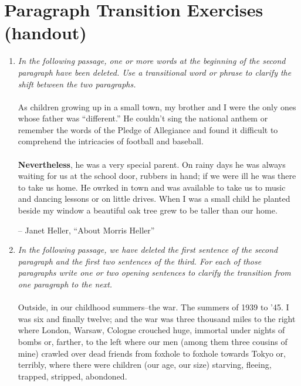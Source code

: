 \documentclass{article}
\begin{document}
\section{Paragraph Transition Exercises (handout)}

\begin{enumerate}
  
\item \textit{In the following passage, one or more words at the beginning of the
second paragraph have been deleted. Use a transitional word or phrase
to clarify the shift between the two paragraphs.}

\paragraph{} As children growing up in a small town, my brother and I were the only
ones whose father was ``different.'' He couldn't sing the national
anthem or remember the words of the Pledge of Allegiance and found it
difficult to comprehend the intricacies of football and baseball.
\paragraph{} \textbf{Nevertheless}, he was a very special parent. On rainy days he
was always waiting for us at the school door, rubbers in hand; if we
were ill he was there to take us home. He owrked in town and was
available to take us to music and dancing lessons or on little
drives. When I was a small child he planted beside my window a
beautiful oak tree grew to be taller than our home.

\hfill -- Janet Heller, ``About Morris Heller''

\item \textit{In the following passage, we have deleted the first sentence of
  the second paragraph and the first two sentences of the third. For
  each of those paragraphs write one or two opening sentences to
  clarify the transition from one paragraph to the next.}

  \paragraph{} Outside, in our childhood summers--the war. The summers of 1939 to
  '45. I was six and finally twelve; and the war was three thousand
  miles to the right where London, Warsaw, Cologne crouched huge,
  immortal under nights of bombs or, farther, to the left where our
  men (among them three cousins of mine) crawled over dead friends
  from foxhole to foxhole towards Tokyo or, terribly, where there were
  children (our age, our size) starving, fleeing, trapped, stripped,
  abondoned.

\end{enumerate}
\end{document}
